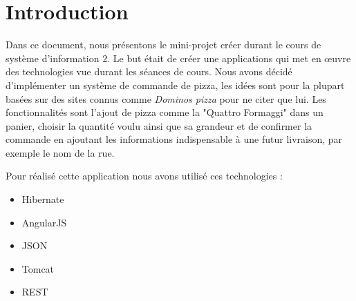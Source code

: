 \section*{Introduction}
\setcounter{page}{1}

Dans ce document, nous présentons le mini-projet créer durant le cours de système d'information 2. Le but était de créer une applications qui met en œuvre des technologies vue durant les séances de cours.
Nous avons décidé d'implémenter un système de commande de pizza, les idées sont pour la plupart basées sur des sites connus comme \textit{Dominos pizza} pour ne citer que lui. Les fonctionnalités sont l'ajout de pizza comme la "Quattro Formaggi" dans un panier, choisir la quantité voulu ainsi que sa grandeur et de confirmer la commande en ajoutant les informations indispensable à une futur livraison, par exemple le nom de la rue.

Pour réalisé cette application nous avons utilisé ces technologies :
\begin{itemize}
\item Hibernate
\item AngularJS
\item JSON
\item Tomcat
\item REST
\end{itemize}

